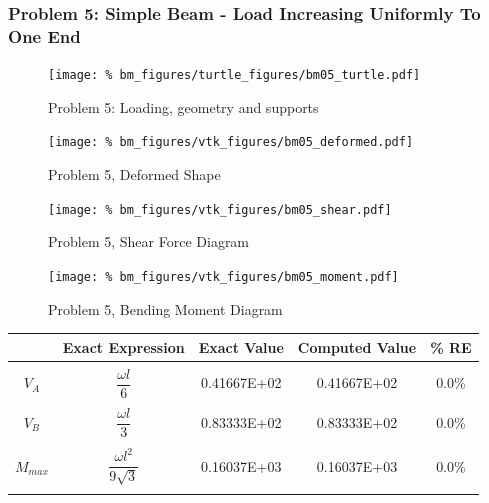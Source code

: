 \subsubsection{Problem 5: Simple Beam - Load Increasing Uniformly To One End}
\begin{figure}[h]
    \texttt{[image: \%
                            bm\_figures/turtle\_figures/bm05\_turtle.pdf]}
    \centering
    \caption{Problem 5: Loading, geometry and supports}
    \label{fig:bm05_turtle}
\end{figure}


\begin{figure}[!htb]
    \texttt{[image: \%
                     bm\_figures/vtk\_figures/bm05\_deformed.pdf]}
    \centering
    \caption{Problem 5, Deformed Shape}
    \label{fig:bm05_deformed}
\end{figure}
\begin{figure}[!htb]
    \texttt{[image: \%
                     bm\_figures/vtk\_figures/bm05\_shear.pdf]}
    \centering
    \caption{Problem 5, Shear Force Diagram}
    \label{fig:bm05_shear}
\end{figure}
\begin{figure}[!htb]
    \texttt{[image: \%
                     bm\_figures/vtk\_figures/bm05\_moment.pdf]}
    \centering
    \caption{Problem 5, Bending Moment Diagram}
    \label{fig:bm05_moment}
\end{figure}
\begin{table}[h!]
\centering
\begin{tabular}{ c| c c c c }
    & Exact Expression & Exact Value & Computed Value & \% RE \\ \hline \\
    $V_A$   & $\dfrac{\omega l}{6}$ &  0.41667E+02 & 0.41667E+02 & 0.0\% \\ \\
    $V_B$  & $\dfrac{ \omega l}{3}$ &  0.83333E+02 & 0.83333E+02 & 0.0\% \\ \\
    $M_{max}$ & $\dfrac{\omega l^2}{9\sqrt{3}}$ &  0.16037E+03 & 0.16037E+03 & 0.0\% \\ \\
\end{tabular}
\end{table}

%
%

\clearpage
